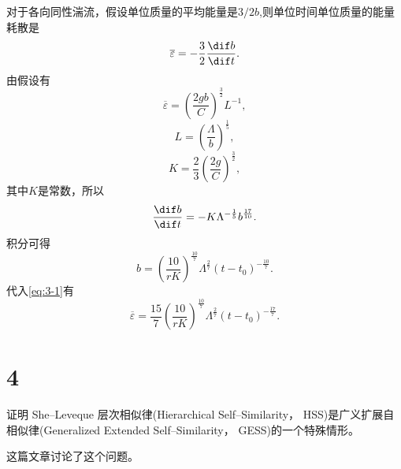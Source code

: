 \documentclass[12pt,a4]{ctexart}
\begin{document}
对于各向同性湍流，假设单位质量的平均能量是$3/2 b$,则单位时间单位质量的能量耗散是
\begin{equation}
   \overline{\varepsilon} = - \frac{3}{2} \frac{\dif b}{\dif t}.
   \label{eq:3-1}
\end{equation}
由假设有
\begin{equation}
   \overline{\varepsilon} = \left( \frac{2gb}{C} \right) ^{\frac{3}{2}} L^{-1},
\end{equation}
\begin{equation}
   L = \left( \frac{\Lambda}{b} \right)^{\frac{1}{5}},
\end{equation}
\begin{equation}
   K = \frac{2}{3} \left( \frac{2g}{C} \right)^{\frac{3}{2}},
\end{equation}
其中$K$是常数，所以
\begin{equation}
   \frac{\dif b}{\dif t} = - K \Lambda^{-\frac{1}{5}} b^{\frac{17}{10}}.
\end{equation}
积分可得
\begin{equation}
   b = \left( \frac{10}{rK} \right)^{\frac{10}{7}} \Lambda^{\frac{2}{7}} (t-t_0)^{-\frac{10}{7}}.
\end{equation}
代入\cref{eq:3-1}有
\begin{equation}
   \overline{\varepsilon} = \frac{15}{7} \left( \frac{10}{rK} \right)^{\frac{10}{7}} \Lambda^{\frac{2}{7}} (t-t_0)^{-\frac{17}{7}} .
\end{equation}






\section{4}

证明 She--Leveque 层次相似律(Hierarchical Self--Similarity， HSS)是广义扩展自 相似律(Generalized Extended Self--Similarity， GESS)的一个特殊情形。

\cite{Emily02} 这篇文章讨论了这个问题。
\end{document}
